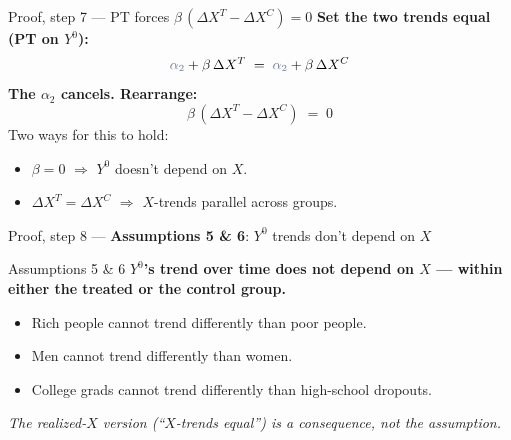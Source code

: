 \documentclass[aspectratio=169,11pt]{beamer}
\begin{document}
\begin{frame}{Proof, step 7 --- PT forces $\beta\,(\Delta X^T - \Delta X^C) = 0$}
\vspace{0.7em}
\textbf{Set the two trends equal (PT on $Y^0$):}
\[
\textcolor{warmgray}{\alpha_2} + \beta\,\Delta X^T \;=\; \textcolor{warmgray}{\alpha_2} + \beta\,\Delta X^C
\]
\vspace{0.2em}
\textbf{The $\alpha_2$ cancels. Rearrange:}
\[
\boxed{\;\; \beta \, (\Delta X^T - \Delta X^C) \;=\; 0 \;\;}
\]
\vspace{0.4em}
Two ways for this to hold:
\begin{itemize}\small
  \item $\beta = 0$ \;$\Rightarrow$\; $Y^0$ doesn't depend on $X$.
  \item $\Delta X^T = \Delta X^C$ \;$\Rightarrow$\; $X$-trends parallel across groups.
\end{itemize}
\end{frame}

\begin{frame}{Proof, step 8 --- \textbf{Assumptions 5 \& 6}: $Y^0$ trends don't depend on $X$}
\vspace{0.4em}
\begin{block}{Assumptions 5 \& 6}
\centering
\small\textbf{$Y^0$'s trend over time does not depend on $X$ --- within either the treated or the control group.}
\end{block}
\vspace{0.4em}
\begin{itemize}\footnotesize
  \item Rich people cannot trend differently than poor people.
  \item Men cannot trend differently than women.
  \item College grads cannot trend differently than high-school dropouts.
\end{itemize}
\vspace{0.2em}
\begin{center}
\footnotesize\color{warmgray}\itshape
The realized-$X$ version (``$X$-trends equal'') is a \textit{consequence}, not the assumption.
\end{center}
\vspace{0.1em}
\begin{center}
\footnotesize
{}
\end{center}
\end{frame}
\end{document}
